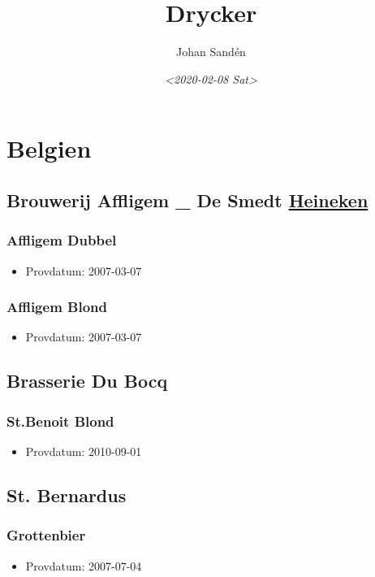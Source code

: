 \documentclass[11pt]{article}
\author{Johan Sandén}
\date{\textit{<2020-02-08 Sat>}}
\title{Drycker}
\begin{document}
\maketitle
\tableofcontents

\section{Belgien}
\label{sec:org9bb4e87}
\subsection{Brouwerij Affligem \_ De Smedt \underline{Heineken}}
\label{sec:org5b3fa24}
\subsubsection{Affligem Dubbel}
\label{sec:orgbb3ea1d}
\begin{itemize}
\item Provdatum: 2007-03-07
\end{itemize}
\subsubsection{Affligem Blond}
\label{sec:org2c1ba08}
\begin{itemize}
\item Provdatum: 2007-03-07
\end{itemize}
\subsection{Brasserie Du Bocq}
\label{sec:orge07146b}
\subsubsection{St.Benoit Blond}
\label{sec:orgb50e08e}
\begin{itemize}
\item Provdatum: 2010-09-01
\end{itemize}
\subsection{St. Bernardus}
\label{sec:org5a1012e}
\subsubsection{Grottenbier}
\label{sec:org71aceb9}
\begin{itemize}
\item Provdatum: 2007-07-04
\end{itemize}
\end{document}
